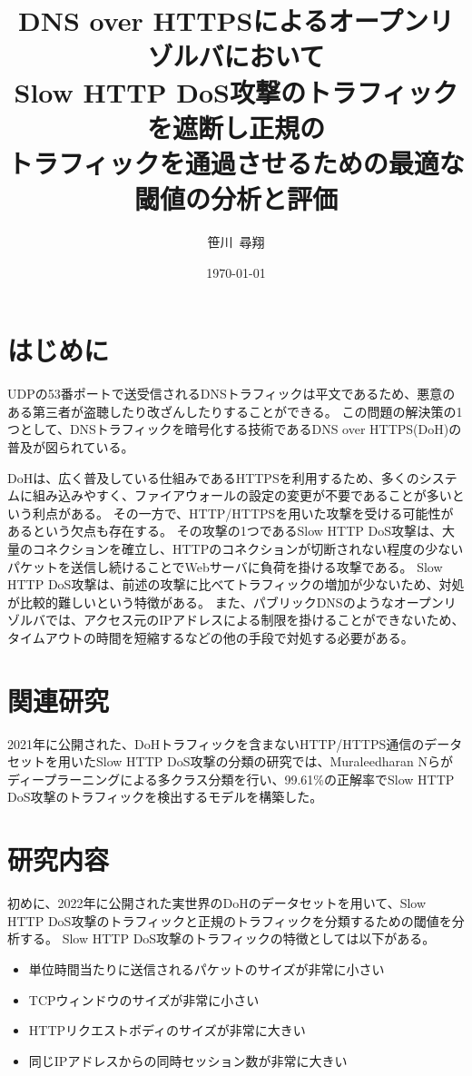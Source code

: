 \documentclass[twocolumn,article]{jlreq}
\title{DNS over HTTPSによるオープンリゾルバにおいて\\Slow HTTP DoS攻撃のトラフィックを遮断し正規の\\トラフィックを通過させるための最適な閾値の分析と評価}
\author{笹川~尋翔}
\date{\today}
\begin{document}
\maketitle

\section{はじめに}\label{sec:intro}
UDPの53番ポートで送受信されるDNSトラフィックは平文であるため、悪意のある第三者が盗聴したり改ざんしたりすることができる。%
この問題の解決策の1つとして、DNSトラフィックを暗号化する技術であるDNS over HTTPS(DoH)の普及が図られている。%

DoHは、広く普及している仕組みであるHTTPSを利用するため、多くのシステムに組み込みやすく、ファイアウォールの設定の変更が不要であることが多いという利点がある。%
その一方で、HTTP/HTTPSを用いた攻撃を受ける可能性があるという欠点も存在する。%
その攻撃の1つであるSlow HTTP DoS攻撃は、大量のコネクションを確立し、HTTPのコネクションが切断されない程度の少ないパケットを送信し続けることでWebサーバに負荷を掛ける攻撃である。%
Slow HTTP DoS攻撃は、前述の攻撃に比べてトラフィックの増加が少ないため、対処が比較的難しいという特徴がある。%
また、パブリックDNSのようなオープンリゾルバでは、アクセス元のIPアドレスによる制限を掛けることができないため、タイムアウトの時間を短縮するなどの他の手段で対処する必要がある。

\section{関連研究}\label{sec:relation}
2021年に公開された、DoHトラフィックを含まないHTTP/HTTPS通信のデータセットを用いたSlow HTTP DoS攻撃の分類の研究\cite{Muraleedharan2021}では、Muraleedharan Nらがディープラーニングによる多クラス分類を行い、99.61\%の正解率でSlow HTTP DoS攻撃のトラフィックを検出するモデルを構築した。


\section{研究内容}
初めに、2022年に公開された実世界のDoHのデータセット\cite{Jerabek2022}を用いて、Slow HTTP DoS攻撃のトラフィックと正規のトラフィックを分類するための閾値を分析する。%
Slow HTTP DoS攻撃のトラフィックの特徴としては以下がある。%

\begin{itemize}
  \item 単位時間当たりに送信されるパケットのサイズが非常に小さい
  \item TCPウィンドウのサイズが非常に小さい
  \item HTTPリクエストボディのサイズが非常に大きい
  \item 同じIPアドレスからの同時セッション数が非常に大きい
\end{itemize}
\end{document}
